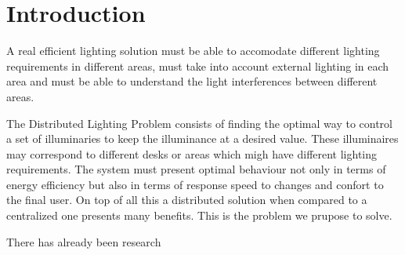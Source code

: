 \section{Introduction}

A real efficient lighting solution must be able to accomodate different lighting requirements in different areas, must take into account external lighting in each area and must be able to understand the light interferences between different areas.

The Distributed Lighting Problem consists of finding the optimal way to control a set of illuminaries to keep the illuminance at a desired value. These illuminaires may correspond to different desks or areas which migh have different lighting requirements. The system must present optimal behaviour not only in terms of energy efficiency but also in terms of response speed to changes and confort to the final user. On top of all this a distributed solution when compared to a centralized one presents many benefits. This is the problem we prupose to solve.

There has already been research
